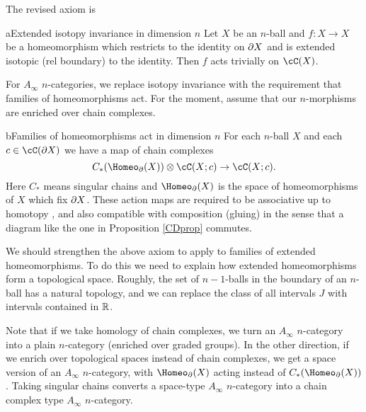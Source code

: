 The revised axiom is

\begin{axiom-numbered}{a}{Extended isotopy invariance in dimension $n$}
\label{axiom:extended-isotopies}
Let $X$ be an $n$-ball and $f: X\to X$ be a homeomorphism which restricts
to the identity on $\partial X$ and is extended isotopic (rel boundary) to the identity.
Then $f$ acts trivially on $\cC(X)$.
\end{axiom-numbered}


\smallskip

For $A_\infty$ $n$-categories, we replace
isotopy invariance with the requirement that families of homeomorphisms act.
For the moment, assume that our $n$-morphisms are enriched over chain complexes.

\begin{axiom-numbered}{b}{Families of homeomorphisms act in dimension $n$}
For each $n$-ball $X$ and each $c\in \cC(\bd X)$ we have a map of chain complexes
\[
	C_*(\Homeo_\bd(X))\ot \cC(X; c) \to \cC(X; c) .
\]
Here $C_*$ means singular chains and $\Homeo_\bd(X)$ is the space of homeomorphisms of $X$
which fix $\partial X$.
These action maps are required to be associative up to homotopy
, and also compatible with composition (gluing) in the sense that
a diagram like the one in Proposition \ref{CDprop} commutes.
\end{axiom-numbered}

We should strengthen the above axiom to apply to families of extended homeomorphisms.
To do this we need to explain how extended homeomorphisms form a topological space.
Roughly, the set of $n{-}1$-balls in the boundary of an $n$-ball has a natural topology,
and we can replace the class of all intervals $J$ with intervals contained in $\mathbb{R}$.

Note that if we take homology of chain complexes, we turn an $A_\infty$ $n$-category
into a plain $n$-category (enriched over graded groups).
In the other direction, if we enrich over topological spaces instead of chain complexes,
we get a space version of an $A_\infty$ $n$-category, with $\Homeo_\bd(X)$ acting 
instead of  $C_*(\Homeo_\bd(X))$.
Taking singular chains converts a space-type $A_\infty$ $n$-category into a chain complex
type $A_\infty$ $n$-category.


